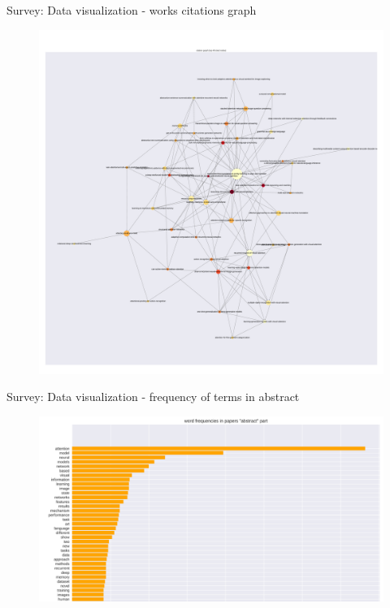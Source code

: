 \documentclass[10pt]{beamer}
\begin{document}
\begin{frame}{Survey: Data visualization - works citations graph}
    \begin{figure}
    \begin{center}
        \includegraphics[width=0.8\linewidth]{./img/titles-graph.pdf}
    \end{center}
    \end{figure}
\end{frame}

\begin{frame}{Survey: Data visualization - frequency of terms in abstract}
    \begin{figure}
    \begin{center}
        \includegraphics[width=1.0\linewidth]{./img/words_freqs_abs.png}
    \end{center}
    \end{figure}
\end{frame}
\end{document}
